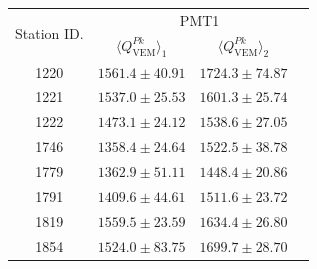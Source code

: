 \documentclass[aspectratio=169]{beamer}
\begin{document}
\begin{frame}
  \footnotesize
  \begin{tabular}{c|c|c|c} \hline
    \multirow{2}{*}{Station ID.} & \multicolumn{3}{c}{PMT1} \\
    \cline{2-4}
    & $\langle Q^{Pk}_{\mathrm{VEM}} \rangle_1$ &
    $\langle Q^{Pk}_{\mathrm{VEM}} \rangle_2$ &  \\
    \cline{1-4}
     1220 & $1561.4\pm40.91$ & $1724.3\pm74.87$ &
     \\ \hline
     1221 & $1537.0\pm25.53$ & $1601.3\pm25.74$ & 
     \\ \hline
     1222 & $1473.1\pm24.12$ & $1538.6\pm27.05$ &
     \\ \hline
     1746 & $1358.4\pm24.64$ & $1522.5\pm38.78$ &
     \\ \hline
     1779 & $1362.9\pm51.11$ & $1448.4\pm20.86$ &
     \\ \hline
     1791 & $1409.6\pm44.61$ & $1511.6\pm23.72$ &
     \\ \hline
     1819 & $1559.5\pm23.59$ & $1634.4\pm26.80$ &
     \\ \hline
     1854 & $1524.0\pm83.75$ & $1699.7\pm28.70$ &
     \\ \hline
  \end{tabular}
\end{frame}
\end{document}

